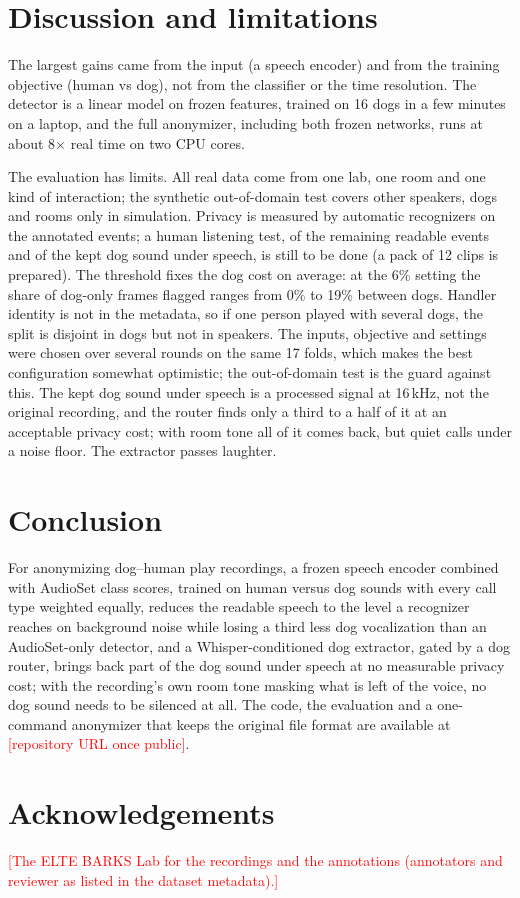 \documentclass[10pt,twocolumn,a4paper]{article}
\newcommand{\todo}[1]{\textcolor{red}{[#1]}}
\begin{document}
\section{Discussion and limitations}
The largest gains came from the input (a speech encoder) and from the training objective (human vs dog),
not from the classifier or the time resolution. The detector is a linear model on frozen features,
trained on 16 dogs in a few minutes on a laptop, and the full anonymizer, including both frozen networks,
runs at about 8$\times$ real time on two CPU cores.

The evaluation has limits. All real data come from one lab, one room and one kind of interaction; the
synthetic out-of-domain test covers other speakers, dogs and rooms only in simulation. Privacy is
measured by automatic recognizers on the annotated events; a human listening test, of the remaining
readable events and of the kept dog sound under speech, is still to be done (a pack of 12 clips is
prepared). The threshold fixes the dog cost on average: at the 6\% setting
the share of dog-only frames flagged ranges from 0\% to 19\% between dogs. Handler identity is not in the
metadata, so if one person played with several dogs, the split is disjoint in dogs but not in speakers.
The inputs, objective and settings were chosen over several rounds on the same 17 folds, which makes the
best configuration somewhat optimistic; the out-of-domain test is the guard against this. The kept dog sound under speech is a processed signal
at 16\,kHz, not the original recording, and the router finds only a third to a half of it at an
acceptable privacy cost; with room tone all of it comes back, but quiet calls under a noise floor. The extractor
passes laughter.

\section{Conclusion}
For anonymizing dog--human play recordings, a frozen speech encoder combined with AudioSet class
scores, trained on human versus dog sounds with every call type weighted equally, reduces the readable
speech to the level a recognizer reaches on background noise while losing a third less dog vocalization
than an AudioSet-only detector, and a Whisper-conditioned dog extractor, gated by a dog router, brings back
part of the dog sound under speech at no measurable privacy cost; with the recording's own room tone
masking what is left of the voice, no dog sound needs to be silenced at all. The code, the evaluation and a
one-command anonymizer that keeps the original file format are available at \todo{repository URL once
public}.

\section*{Acknowledgements}
\todo{The ELTE BARKS Lab for the recordings and the annotations (annotators and reviewer as listed in
the dataset metadata).}

\small


\end{document}

